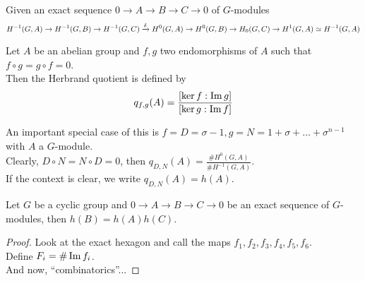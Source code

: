 \documentclass[../main.tex]{subfiles}
\begin{document}
Given an exact sequence $0 \to A \to B \to C \to 0$ of $G$-modules
\[ 
	H^{-1}( G,A) \to H^{-1}( G,B) \to H^{-1}( G,C) \xrightarrow{\delta} H^{0}( G,A) \to H^{0}( G,B) \to H_0( G,C) \to H^{1}( G,A) \simeq H^{-1}( G,A) 
\]
\begin{defn}
	Let $A$ be an abelian group and $f,g$ two endomorphisms of $A$ such that $f\circ g = g\circ f = 0$.\\
	Then the Herbrand quotient is defined by
	\[ 
		q_{f,g} ( A) = \frac{[\ker f : \operatorname{Im} g]}{[\ker g: \operatorname{Im} f]}
	\]
	
\end{defn}
An important special case of this is $f= D = \sigma-1,g= N = 1+ \sigma + \ldots + \sigma^{n-1}$ with $A$ a $G$-module.\\
Clearly, $D\circ N = N \circ D =0$, then $q_{D,N} ( A)= \frac{\# H^{0}( G,A) }{\# H^{-1}( G,A) }$.\\
If the context is clear, we write $q_{D,N} ( A) =h( A) $.\\
\begin{thm}
	Let $G$ be a cyclic group and $0\to A \to B\to C \to 0$ be an exact sequence of $G$-modules, then $h( B) = h( A) h( C) $.
\end{thm}
\begin{proof}
Look at the exact hexagon and call the maps $f_1,f_2,f_3,f_4,f_5,f_6$.\\
Define $F_i = \# \operatorname{Im} f_i$.\\
And now, ``combinatorics''...
\end{proof}
\end{document}
